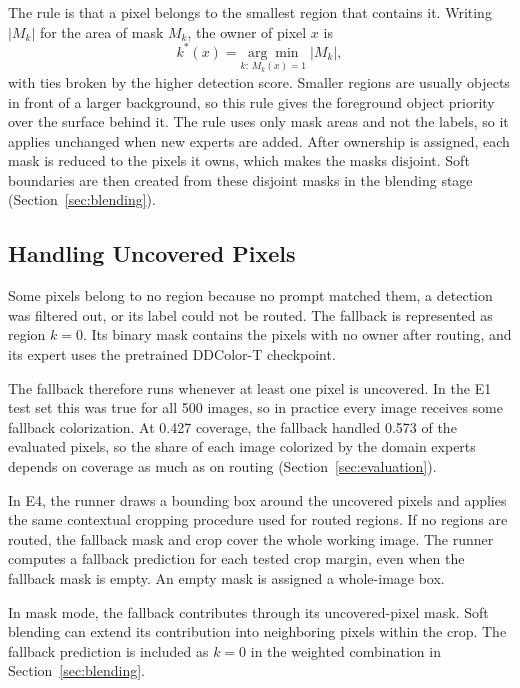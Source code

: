 \documentclass{FastFyp}
\begin{document}
The rule is that a pixel belongs to the smallest region that contains it. Writing $|M_k|$ for the area of mask $M_k$, the owner of pixel $x$ is
\begin{equation}
    k^{*}(x) = \underset{k:\,M_k(x)=1}{\arg\min}\; |M_k|,
\end{equation}
with ties broken by the higher detection score. Smaller regions are usually objects in front of a larger background, so this rule gives the foreground object priority over the surface behind it. The rule uses only mask areas and not the labels, so it applies unchanged when new experts are added. After ownership is assigned, each mask is reduced to the pixels it owns, which makes the masks disjoint. Soft boundaries are then created from these disjoint masks in the blending stage (Section~\ref{sec:blending}).

\subsection{Handling Uncovered Pixels}
\label{sec:fallback}

Some pixels belong to no region because no prompt matched them, a detection was
filtered out, or its label could not be routed. The fallback is represented as
region $k=0$. Its binary mask contains the pixels with no owner after routing,
and its expert uses the pretrained DDColor-T checkpoint.

The fallback therefore runs whenever at least one pixel is uncovered. In the E1
test set this was true for all 500 images, so in practice every image receives
some fallback colorization. At 0.427 coverage, the fallback handled 0.573 of the
evaluated pixels, so the share of each image colorized by the domain experts
depends on coverage as much as on routing (Section~\ref{sec:evaluation}).

In E4, the runner draws a bounding box around the uncovered pixels and applies
the same contextual cropping procedure used for routed regions. If no regions
are routed, the fallback mask and crop cover the whole working image. The runner
computes a fallback prediction for each tested crop margin, even when the
fallback mask is empty. An empty mask is assigned a whole-image box.

In mask mode, the fallback contributes through its uncovered-pixel mask.
Soft blending can extend its contribution into neighboring pixels within the
crop. The fallback prediction is included as $k=0$ in the weighted combination
in Section~\ref{sec:blending}.
\end{document}
